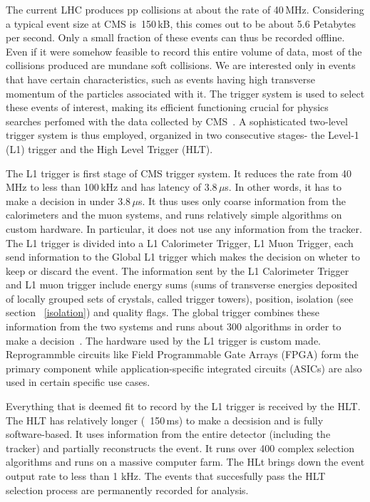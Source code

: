 The current LHC produces pp collisions at about the rate of 40\,MHz. Considering a typical event size at CMS is~150\,kB, this comes out to be about 5.6 Petabytes per second. Only a small fraction of these events can thus be recorded offline. Even if it were somehow feasible to record this entire volume of data,  most of the collisions produced are mundane soft collisions. We are interested only in events that have certain characteristics, such as events having high transverse momentum of the particles associated with it. The trigger system is used to select these events of interest, making its efficient functioning crucial for physics searches perfomed with the data collected by CMS~\cite{trigger1}. A sophisticated two-level trigger system is thus employed, organized in two consecutive stages- the Level-1 (L1) trigger and the High Level Trigger (HLT).


The L1 trigger is first stage of CMS trigger system. It reduces the rate from 40\,MHz to less than 100\,kHz and has latency of 3.8\,$\mu$s. In other words, it has to make a decision in under 3.8\,$\mu$s. It thus uses only coarse information from the calorimeters and the muon systems, and runs relatively simple algorithms on custom hardware. In particular, it does not use any information from the tracker. The L1 trigger is divided into a L1 Calorimeter Trigger, L1 Muon Trigger, each send information to the Global L1 trigger which makes the decision on wheter to keep or discard the event. The information sent by the L1 Calorimeter Trigger and L1 muon trigger include energy sums (sums of transverse energies deposited of locally grouped sets of crystals, called trigger towers), position, isolation (see section ~\ref{isolation}) and quality flags. The global trigger combines these information from the two systems and runs about 300 algorithms in order to make a decision~\cite{trigger2}. The hardware used by the L1 trigger is custom made. Reprogrammble circuits like Field Programmable Gate Arrays (FPGA) form the primary component while application-specific integrated circuits (ASICs) are also used in certain specific use cases.  

Everything that is deemed fit to record by the L1 trigger is received by the HLT. The HLT has relatively longer (~150\,ms) to make a decsision and is fully software-based. It uses information from the entire detector (including the tracker) and partially reconstructs the event. It runs over 400 complex selection algorithms and runs on a massive computer farm. The HLt brings down the event output rate to less than 1 kHz. The events  that succesfully pass the HLT selection process are permanently recorded for analysis. 

